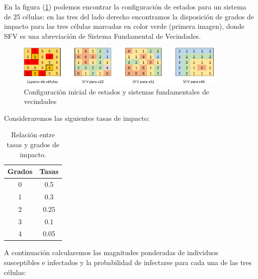 \begin{example}\label{ex:SIenAutómatasCelulares}
En la figura (\ref{fig:configuraciónInicialEspacio25Celulas}) podemos encontrar la configuración de estados para un sistema de 25 células: en las tres del lado derecho encontramos la disposición de grados de impacto para las tres células marcadas en color verde (primera imagen), donde SFV es una abreviación de Sistema Fundamental de Vecindades.


\begin{figure}[h]
  \centering
    \includegraphics[width=0.9\textwidth]{Imagenes/cellSpace.PNG}
    \caption{Configuración inicial de estados y sistemas fundamentales de vecindades}
    \label{fig:configuraciónInicialEspacio25Celulas}
\end{figure}

Consideraremos las siguientes tasas de impacto:

\begin{table}[h]
\begin{center}
\begin{tabular}{| c | c |}
\hline
Grados & Tasas \\ \hline
0 & 0.5 \\
1 & 0.3\\
2 & 0.25\\
3 & 0.1\\ 
4 & 0.05\\ \hline
\end{tabular}
\caption{Relación entre tasas y grados de impacto.}
\end{center}
\end{table}

A continuación calcularemos las magnitudes ponderadas de individuos susceptibles e infectados y la probabilidad de infectarse para cada una de las tres células:


\end{example}
